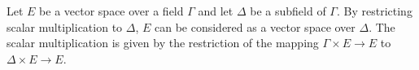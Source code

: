 Let $E$ be a vector space over a field $\Gamma$ and let $\Delta$ be a subfield of $\Gamma$. By restricting scalar multiplication to $\Delta$, $E$ can be considered as a vector space over $\Delta$. The scalar multiplication is given by the restriction of the mapping $\Gamma \times E \to E$ to $\Delta \times E \to E$.
